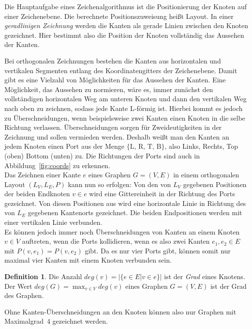 \documentclass[a4paper]{scrreprt}
\theoremstyle{definition}
\newtheorem{definition}[satz]{Definition}
\begin{document}
Die Hauptaufgabe eines Zeichenalgorithmus ist die Positionierung der Knoten auf einer Zeichenebene. Die berechnete Positionszuweisung heißt Layout. In einer \emph{geradlinigen Zeichnung} werden die Kanten als gerade Linien zwischen den Knoten gezeichnet. Hier bestimmt also die Position der Knoten vollständig das Aussehen der Kanten.

Bei orthogonalen Zeichnungen bestehen die Kanten aus horizontalen und vertikalen Segmenten entlang des Koordinatengitters der Zeichenebene. Damit gibt es eine Vielzahl von Möglichkeiten für das Aussehen der Kanten. Eine Möglichkeit, das Aussehen zu normieren, wäre es, immer zunächst den vollständigen horizontalen Weg am unteren Knoten und dann den vertikalen Weg nach oben zu zeichnen, sodass jede Kante L-förmig ist. Hierbei kommt es jedoch zu Überschneidungen, wenn beispielsweise zwei Kanten einen Knoten in die selbe Richtung verlassen. Überschneidungen sorgen für Zweideutigkeiten in der Zeichnung und sollen vermieden werden. Deshalb weißt man den Kanten an jedem Knoten einen Port aus der Menge $\{\text{L, R, T, B}\}$, also Links, Rechts, Top (oben) Bottom (unten) zu. Die Richtungen der Ports sind auch in Abbildung~\ref{fig:coords} zu erkennen.
\\

Das Zeichnen einer Kante $e$ eines Graphen $G = (V,E)$ in einem orthogonalen Layout $(L_V,L_E,P)$ kann nun so erfolgen: Von den von $L_V$ gegebenen Positionen der beiden Endknoten $v \in e$ wird eine Gittereinheit in der Richtung des Ports gezeichnet. Von diesen Positionen aus wird eine horizontale Linie in Richtung des von $L_E$ gegebenen Kantenorts gezeichnet. Die beiden Endpositionen werden mit einer vertikalen Linie verbunden. %
\\

Es können jedoch immer noch Überschneidungen von Kanten an einem Knoten $v \in V$ auftreten, wenn die Ports kollidieren, wenn es also zwei Kanten $e_1, e_2 \in E$ mit $P(v, e_1) = P(v, e_2)$ gibt. Da es nur vier Ports gibt, können somit nur maximal vier Kanten mit einem Knoten verbunden sein.

\begin{definition}
  Die Anzahl $deg(v) = |\{e \in E | v \in e\}|$ ist der \emph{Grad} eines Knotens. Der Wert $deg(G) = \max_{v \in V}{deg(v)}$ eines Graphen $G = (V, E)$ ist der Grad des Graphen.
\end{definition}

Ohne Kanten-Überschneidungen an den Knoten können also nur Graphen mit Maximalgrad~4 gezeichnet werden. 
\end{document}
